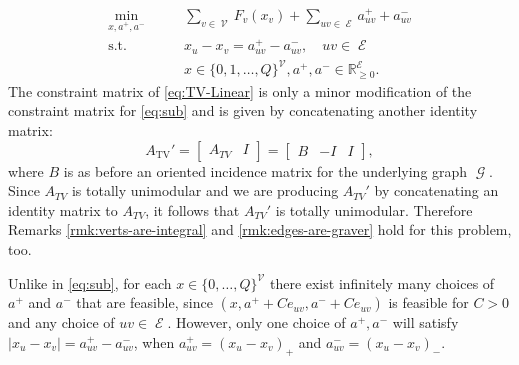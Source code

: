 \documentclass[pdflatex,sn-mathphys-num]{sn-jnl}%
\newcommand{\R}{\mathbb{R}} %
\DeclareMathOperator{\Gcal}{\mathcal{G}}
\DeclareMathOperator{\Ecal}{\mathcal{E}}
\DeclareMathOperator{\Vcal}{\mathcal{V}}
\DeclareMathOperator{\TV}{TV}
\begin{document}
\begin{subequations}
\begin{align}
    \min_{x,a^+,a^-} \qquad &\sum_{v \in \Vcal} F_v(x_v) + \sum_{uv \in \Ecal} a_{uv}^+ + a_{uv}^- \\
    \text{s.t.} \qquad & x_u - x_v = a_{uv}^+ - a_{uv}^-, \quad uv \in \Ecal\\
                & x \in \{0,1,\ldots,Q\}^{\Vcal}, a^+, a^- \in \R_{\ge 0}^{\Ecal}.
\end{align} \label{eq:TV-Linear}
\end{subequations}
The constraint matrix of \eqref{eq:TV-Linear} is only a minor modification of the constraint matrix for \eqref{eq:sub} and is given by concatenating another identity matrix:
\begin{equation}
    A_{\TV}' = \begin{bmatrix}
        A_{TV} & I
    \end{bmatrix} = \begin{bmatrix} B & -I & I\end{bmatrix},\label{eq:tv-constraints}
\end{equation}
where $B$ is as before an oriented incidence matrix for the underlying graph $\Gcal$. Since $A_{TV}$ is totally unimodular and we are producing $A_{TV}'$ by concatenating an identity matrix to $A_{TV}$, it follows that $A_{TV}'$ is totally unimodular.  Therefore Remarks \ref{rmk:verts-are-integral} and \ref{rmk:edges-are-graver} hold for this problem, too.

Unlike in \eqref{eq:sub}, for each $x \in \{0,\ldots, Q\}^{\Vcal}$ there exist infinitely many choices of $a^+$ and $a^-$ that are feasible, since $(x, a^+ + Ce_{uv}, a^- + Ce_{uv})$ is feasible for $C > 0$ and any choice of $uv \in \Ecal$. However, only one choice of $a^+,a^-$ will satisfy $|x_u - x_v| = a_{uv}^+ - a_{uv}^-$, when $a_{uv}^+ = (x_u - x_v)_+$ and $a_{uv}^- = (x_u - x_v)_-$. 
\end{document}
